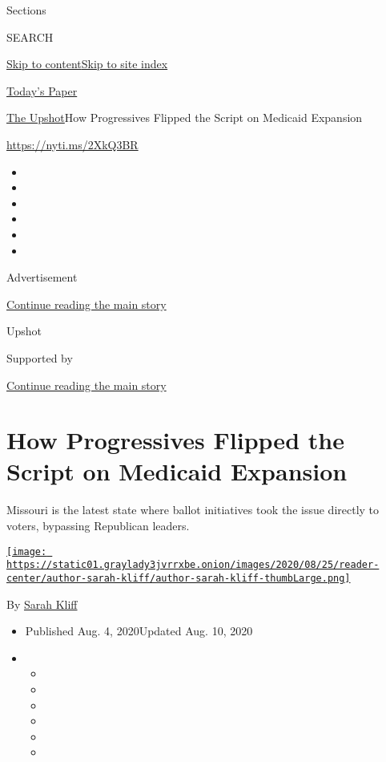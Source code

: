 Sections

SEARCH

\protect\hyperlink{site-content}{Skip to
content}\protect\hyperlink{site-index}{Skip to site index}

\href{https://myaccount.nytimes3xbfgragh.onion/auth/login?response_type=cookie\&client_id=vi}{}

\href{https://www.nytimes3xbfgragh.onion/section/todayspaper}{Today's
Paper}

\href{/section/upshot}{The Upshot}\textbar{}How Progressives Flipped the
Script on Medicaid Expansion

\url{https://nyti.ms/2XkQ3BR}

\begin{itemize}
\item
\item
\item
\item
\item
\item
\end{itemize}

Advertisement

\protect\hyperlink{after-top}{Continue reading the main story}

Upshot

Supported by

\protect\hyperlink{after-sponsor}{Continue reading the main story}

\hypertarget{how-progressives-flipped-the-script-on-medicaid-expansion}{%
\section{How Progressives Flipped the Script on Medicaid
Expansion}\label{how-progressives-flipped-the-script-on-medicaid-expansion}}

Missouri is the latest state where ballot initiatives took the issue
directly to voters, bypassing Republican leaders.

\href{https://www.nytimes3xbfgragh.onion/by/sarah-kliff}{\texttt{[image: https://static01.graylady3jvrrxbe.onion/images/2020/08/25/reader-center/author-sarah-kliff/author-sarah-kliff-thumbLarge.png]}}

By \href{https://www.nytimes3xbfgragh.onion/by/sarah-kliff}{Sarah Kliff}

\begin{itemize}
\item
  Published Aug. 4, 2020Updated Aug. 10, 2020
\item
  \begin{itemize}
  \item
  \item
  \item
  \item
  \item
  \item
  \end{itemize}
\end{itemize}

